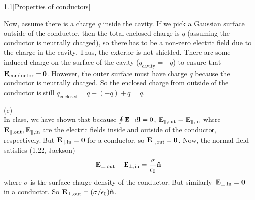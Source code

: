 \documentclass[12pt]{article}
\begin{document}
\begin{problem}{1.1}[Properties of conductors]
\begin{solution}
Now, assume there is a charge $q$ inside the cavity. If we pick a Gaussian
surface outside of the conductor, then the total enclosed charge is $q$
(assuming the conductor is neutrally charged), so there has to be a non-zero 
electric field due to the charge in the cavity. Thus, the exterior is not
shielded. There are some induced charge on the surface of the cavity
($q_{\text{cavity}}=-q$) to ensure that $\vb{E}_{\text{conductor}}=\vb{0}$.
However, the outer surface must have charge $q$ because the conductor is 
neutrally charged. So the enclosed charge from outside of the conductor is still
$q_{\text{enclosed}}=q+(-q)+q=q$.
\newpage

(c)\\[2in]
In class, we have shown that because $\oint\vb{E}\vdot
d\vb{l}=0$, $\vb{E}_{\|,\text{out}}=\vb{E}_{\|,\text{in}}$ where
$\vb{E}_{\|,\text{out}},\vb{E}_{\|,\text{in}}$ are the electric fields inside
and outside of the conductor, respectively. But $\vb{E}_{\|,\text{in}}=\vb{0}$
for a conductor, so $\vb{E}_{\|,\text{out}}=\vb{0}$. Now,
the normal field satisfies (1.22, Jackson)
\begin{equation}
    \vb{E}_{\perp,\text{out}}-\vb{E}_{\perp,\text{in}}
    =\frac{\sigma}{\epsilon_0}\vb{\hat{n}} 
\end{equation}
where $\sigma$ is the surface charge density of the conductor. But similarly, 
$\vb{E}_{\perp,\text{in}}=\vb{0}$ in a conductor. So
$\vb{E}_{\perp,\text{out}}=(\sigma/\epsilon_0)\vb{\hat{n}}$.

\end{solution}

\end{problem}
\end{document}
